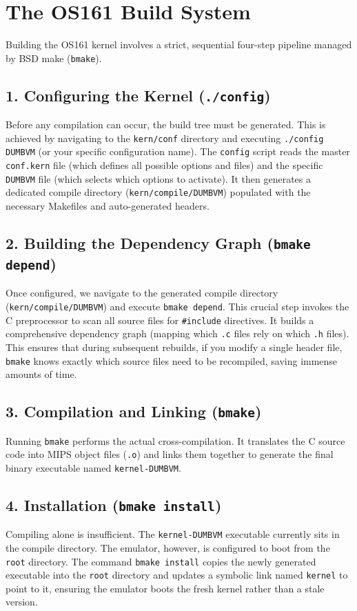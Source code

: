 \section{The OS161 Build System}
Building the OS161 kernel involves a strict, sequential four-step pipeline managed by BSD make (\texttt{bmake}).

\subsection{1. Configuring the Kernel (\texttt{./config})}
Before any compilation can occur, the build tree must be generated. This is achieved by navigating to the \texttt{kern/conf} directory and executing \texttt{./config DUMBVM} (or your specific configuration name). 
The \texttt{config} script reads the master \texttt{conf.kern} file (which defines all possible options and files) and the specific \texttt{DUMBVM} file (which selects which options to activate). It then generates a dedicated compile directory (\texttt{kern/compile/DUMBVM}) populated with the necessary Makefiles and auto-generated headers.

\subsection{2. Building the Dependency Graph (\texttt{bmake depend})}
Once configured, we navigate to the generated compile directory (\texttt{kern/compile/DUMBVM}) and execute \texttt{bmake depend}. 
This crucial step invokes the C preprocessor to scan all source files for \texttt{\#include} directives. It builds a comprehensive dependency graph (mapping which \texttt{.c} files rely on which \texttt{.h} files). This ensures that during subsequent rebuilds, if you modify a single header file, \texttt{bmake} knows exactly which source files need to be recompiled, saving immense amounts of time.

\subsection{3. Compilation and Linking (\texttt{bmake})}
Running \texttt{bmake} performs the actual cross-compilation. It translates the C source code into MIPS object files (\texttt{.o}) and links them together to generate the final binary executable named \texttt{kernel-DUMBVM}.

\subsection{4. Installation (\texttt{bmake install})}
Compiling alone is insufficient. The \texttt{kernel-DUMBVM} executable currently sits in the compile directory. The emulator, however, is configured to boot from the \texttt{root} directory. The command \texttt{bmake install} copies the newly generated executable into the \texttt{root} directory and updates a symbolic link named \texttt{kernel} to point to it, ensuring the emulator boots the fresh kernel rather than a stale version.

